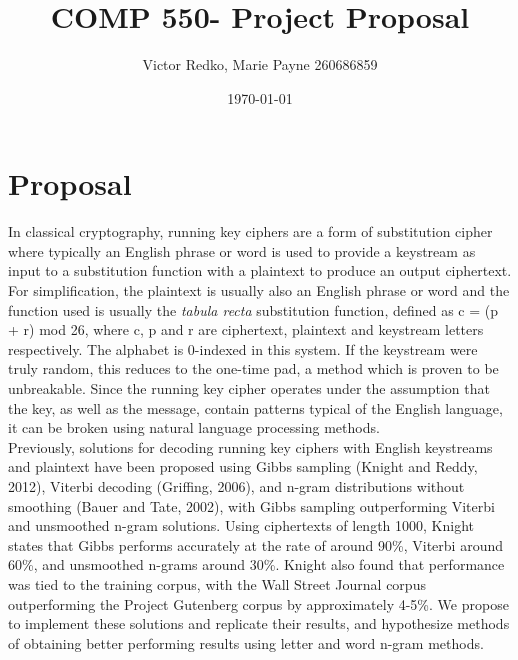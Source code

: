 \documentclass[letterpaper,12pt]{article}
\begin{document}
	
	\title{COMP 550- Project Proposal}
	\author{Victor Redko, Marie Payne 260686859}
	\date{\today}
	\maketitle
	

\section{Proposal}
In classical cryptography, running key ciphers are a form of substitution cipher where typically an English phrase or word is used to provide a keystream as input to a substitution function with a plaintext to produce an output ciphertext. For simplification, the plaintext is usually also an English phrase or word and the  function used is usually the \textit{tabula recta} substitution function, defined as c = (p + r) mod 26, where c, p and r are ciphertext, plaintext and keystream letters respectively. The alphabet is 0-indexed in this system. If the keystream were truly random, this reduces to the one-time pad, a method which is proven to be unbreakable. Since the running key cipher operates under the assumption that the key, as well as the message, contain patterns typical of the English language, it can be broken using natural language processing methods.\\
\hfill \break
Previously, solutions for decoding running key ciphers with English keystreams and plaintext have been proposed using Gibbs sampling (Knight and Reddy, 2012), Viterbi decoding (Griffing, 2006), and n-gram distributions without smoothing (Bauer and Tate, 2002), with Gibbs sampling outperforming Viterbi and unsmoothed n-gram solutions. Using ciphertexts of length 1000, Knight states that Gibbs performs accurately at the rate of around 90\%, Viterbi around 60\%, and unsmoothed n-grams around 30\%. Knight also found that performance was tied to the training corpus, with the Wall Street Journal corpus outperforming the Project Gutenberg corpus by approximately 4-5\%. We propose to implement these solutions and replicate their results, and hypothesize methods of obtaining better performing results using letter and word n-gram methods. 


\end{document}
